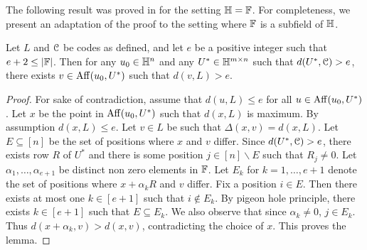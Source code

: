 The following result was proved in \cite{ligero} for the setting $\mathbb{H}=\mathbb{F}$.
For completeness, we present an adaptation of the proof to the setting where
$\mathbb{F}$ is a subfield of $\mathbb{H}$.
\begin{lemma}\label{lem:farpoint}
	Let $L$ and $\mathcal{C}$ be codes as defined, and let $e$ be a positive integer such that $e+2\leq |\mathbb{F}|$. Then for any $u_0\in \mathbb{H}^n$ and any $U^\ast\in \mathbb{H}^{m\times n}$ such that $d(U^\ast,\mathcal{C})>e$, there exists $v\in {\rm Aff}({u_0},{U^\ast})$ such that $d(v,L)>e$.
\end{lemma} 
\begin{proof}
	For sake of contradiction, assume that $d(u,L)\leq e$ for all $u\in
	{\rm Aff}({u_0},{U^\ast})$. Let $x$ be the point in ${\rm Aff}({u_0},{U^\ast})$ such that
	$d(x,L)$ is maximum. By assumption $d(x,L)\leq e$. Let $v\in L$ be such that
	$\Delta(x,v)=d(x,L)$. Let $E\subseteq [n]$ be the set of positions where $x$ and
	$v$ differ. Since $d(U^\ast,\mathcal{C})>e$, there exists row $R$ of $U^\ast$ and there is some 
	position $j\in [n]\backslash E$ 
	such that $R_j\neq 0$. Let
	$\alpha_1,\ldots,\alpha_{e+1}$ be distinct non zero elements in $\mathbb{F}$. Let $E_k$
	for $k=1,\ldots,e+1$ denote the set of positions where $x+\alpha_kR$ and $v$
	differ. Fix a position $i\in E$. Then there exists at most one $k\in [e+1]$ such
	that $i\not\in E_k$. By pigeon hole principle, there exists $k\in [e+1]$ such
	that $E\subseteq E_k$. We also observe that since $\alpha_k\neq 0$, $j\in E_k$.
	Thus $d(x+\alpha_k,v)>d(x,v)$, contradicting the choice of $x$. This proves the
	lemma.   
\end{proof}

